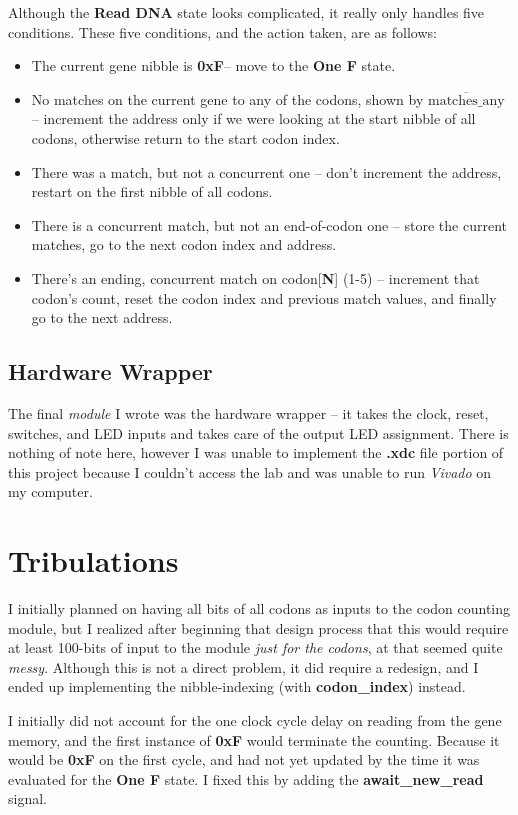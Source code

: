 \documentclass[a4paper, 12pt]{article}
\newcommand*{\Vivado}{\textit{Vivado}\xspace} %
\begin{document}
Although the \textbf{Read DNA} state looks complicated, it really only handles five conditions. These five conditions, and the action taken, are as follows:

\begin{itemize}
\item The current gene nibble is \textbf{0xF}-- move to the \textbf{One F} state.
\item No matches on the current gene to any of the codons, shown by $\overline{\text{matches\_any}}$ -- increment the address only if we were looking at the start nibble of all codons, otherwise return to the start codon index.
\item There was a match, but not a concurrent one -- don't increment the address, restart on the first nibble of all codons.
\item There is a concurrent match, but not an end-of-codon one -- store the current matches, go to the next codon index and address.
\item There's an ending, concurrent match on codon[\textbf{N}] (1-5) -- increment that codon's count, reset the codon index and previous match values, and finally go to the next address.
\end{itemize}

\subsection{Hardware Wrapper}
The final \textit{module} I wrote was the hardware wrapper -- it takes the clock, reset, switches, and LED inputs and takes care of the output LED assignment. There is nothing of note here, however I was unable to implement the \textbf{.xdc} file portion of this project because I couldn't access the lab and was unable to run \Vivado on my computer.

\section{Tribulations}
\label{sec:tribulations}
I initially planned on having all bits of all codons as inputs to the codon counting module, but I realized after beginning that design process that this would require at least 100-bits of input to the module \textit{just for the codons}, at that seemed quite \textit{messy}. Although this is not a direct problem, it did require a redesign, and I ended up implementing the nibble-indexing (with \textbf{codon\_index}) instead.

I initially did not account for the one clock cycle delay on reading from the gene memory, and the first instance of \textbf{0xF} would terminate the counting. Because it would be \textbf{0xF} on the first cycle, and had not yet updated by the time it was evaluated for the \textbf{One F} state. I fixed this by adding the \textbf{await\_new\_read} signal.
\end{document}

